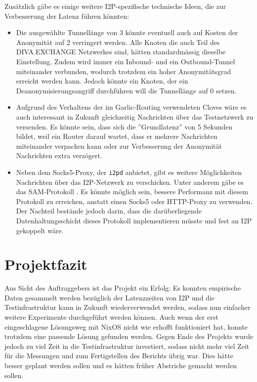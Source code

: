 Zusätzlich gäbe es einige weitere I2P-spezifische technische Ideen, die zur Verbesserung der Latenz führen könnten:
\begin{itemize}
  \item Die ausgewählte Tunnellänge von 3 könnte eventuell auch auf Kosten der Anonymität auf 2 verringert werden. Alle Knoten die auch Teil des DIVA.EXCHANGE Netzwerkes sind, hätten standardmässig dieselbe Einstellung.
    Zudem wird immer ein Inbound- und ein Outbound-Tunnel miteinander verbunden, wodurch trotzdem ein hoher Anonymitätsgrad erreicht werden kann.
    Jedoch könnte ein Knoten, der ein Deanonymisierungsangriff durchführen will die Tunnellänge auf 0 setzen.
  \item Aufgrund des Verhaltens der im Garlic-Routing verwendeten Cloves wäre es auch interessant in Zukunft gleichzeitig Nachrichten über das Testnetzwerk zu versenden. Es könnte sein, dass sich die ''Grundlatenz'' von 5 Sekunden bildet, weil ein Router darauf wartet, dass er mehrere Nachrichten miteinander verpacken kann oder zur Verbesserung der Anonymität Nachrichten extra verzögert.
  \item Neben dem Socks5-Proxy, der \lstinline|i2pd| anbietet, gibt es weitere Möglichkeiten Nachrichten über das I2P-Netzwerk zu verschicken.
    Unter anderem gäbe es das SAM-Protokoll \parencite{noauthor_sam_nodate}.
    Es könnte möglich sein, bessere Performanz mit diesem Protokoll zu erreichen, anstatt einen Socks5 oder HTTP-Proxy zu verwenden. 
    Der Nachteil bestände jedoch darin, dass die darüberliegende Datenhaltungsschicht dieses Protokoll implementieren müsste und fest an I2P gekoppelt wäre.
\end{itemize}


\clearpage

\section{Projektfazit}

Aus Sicht des Auftraggebers ist das Projekt ein Erfolg:
Es konnten empirische Daten gesammelt werden bezüglich der Latenzzeiten von I2P und die Testinfrastruktur kann in Zukunft wiederverwendet werden, sodass nun einfacher weitere Experimente durchgeführt werden können.
Auch wenn der erst eingeschlagene Lösungsweg mit NixOS nicht wie erhofft funktioniert hat, konnte trotzdem eine passende Lösung gefunden werden.
Gegen Ende des Projekts wurde jedoch zu viel Zeit in die Testinfrastruktur investiert, sodass nicht mehr viel Zeit für die Messungen und zum Fertigstellen des Berichts übrig war. Dies hätte besser geplant werden sollen und es hätten früher Abstriche gemacht werden sollen.

